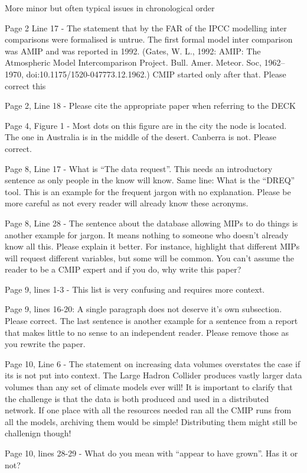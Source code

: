 \documentclass[gmd,manuscript]{copernicus}
\begin{document}
More minor but often typical issues in chronological order

Page 2 Line 17 - The statement that by the FAR of the IPCC modelling
inter comparisons were formalised is untrue. The first formal model
inter comparison was AMIP and was reported in 1992. (Gates, W. L.,
1992: AMIP: The Atmospheric Model Intercomparison Project. Bull. Amer.
Meteor. Soc, 1962–1970, doi:10.1175/1520-047773.12.1962.) CMIP started
only after that. Please correct this

Page 2, Line 18 - Please cite the appropriate paper when referring to
the DECK

Page 4, Figure 1 - Most dots on this figure are in the city the node
is located. The one in Australia is in the middle of the desert.
Canberra is not. Please correct.

Page 8, Line 17 - What is “The data request”. This needs an
introductory sentence as only people in the know will know. Same line:
What is the “DREQ” tool. This is an example for the frequent jargon
with no explanation. Please be more careful as not every reader will
already know these acronyms.

Page 8, Line 28 - The sentence about the database allowing MIPs to do
things is another example for jargon. It means nothing to someone who
doesn’t already know all this. Please explain it better. For instance,
highlight that different MIPs will request different variables, but
some will be common. You can’t assume the reader to be a CMIP expert
and if you do, why write this paper?

Page 9, lines 1-3 - This list is very confusing and requires more
context.

Page 9, lines 16-20: A single paragraph does not deserve it’s own
subsection. Please correct. The last sentence is another example for a
sentence from a report that makes little to no sense to an independent
reader. Please remove those as you rewrite the paper.

Page 10, Line 6 - The statement on increasing data volumes overstates
the case if its is not put into context. The Large Hadron Collider
produces vastly larger data volumes than any set of climate models
ever will! It is important to clarify that the challenge is that the
data is both produced and used in a distributed network. If one place
with all the resources needed ran all the CMIP runs from all the
models, archiving them would be simple! Distributing them might still
be challenign though!

Page 10, lines 28-29 - What do you mean with “appear to have grown”.
Has it or not?
\end{document}
